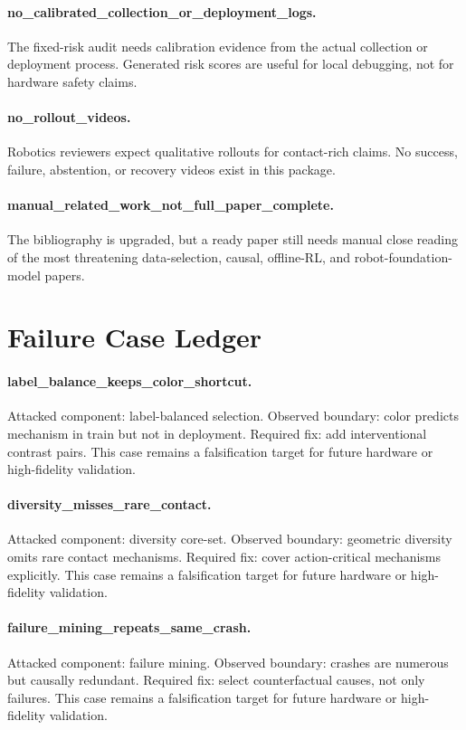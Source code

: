 \documentclass{article}
\begin{document}
\paragraph{no\_calibrated\_collection\_or\_deployment\_logs.} The fixed-risk audit needs calibration evidence from the actual collection or deployment process. Generated risk scores are useful for local debugging, not for hardware safety claims.
\paragraph{no\_rollout\_videos.} Robotics reviewers expect qualitative rollouts for contact-rich claims. No success, failure, abstention, or recovery videos exist in this package.
\paragraph{manual\_related\_work\_not\_full\_paper\_complete.} The bibliography is upgraded, but a ready paper still needs manual close reading of the most threatening data-selection, causal, offline-RL, and robot-foundation-model papers.
\clearpage
\section{Failure Case Ledger}
\paragraph{label\_balance\_keeps\_color\_shortcut.} Attacked component: label-balanced selection. Observed boundary: color predicts mechanism in train but not in deployment. Required fix: add interventional contrast pairs. This case remains a falsification target for future hardware or high-fidelity validation.
\paragraph{diversity\_misses\_rare\_contact.} Attacked component: diversity core-set. Observed boundary: geometric diversity omits rare contact mechanisms. Required fix: cover action-critical mechanisms explicitly. This case remains a falsification target for future hardware or high-fidelity validation.
\paragraph{failure\_mining\_repeats\_same\_crash.} Attacked component: failure mining. Observed boundary: crashes are numerous but causally redundant. Required fix: select counterfactual causes, not only failures. This case remains a falsification target for future hardware or high-fidelity validation.
\end{document}
